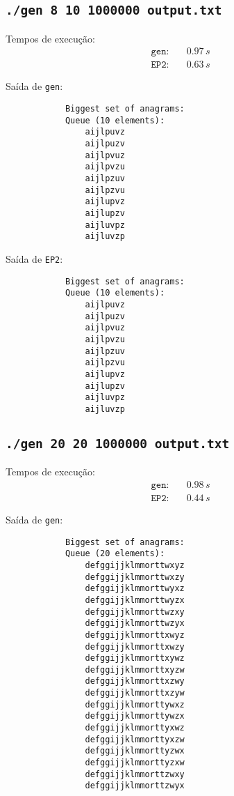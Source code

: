 \documentclass[a4paper]{article}
\newcommand{\ttt}{\texttt}
\begin{document}
    \newpage
    \subsection{\tt ./gen 8 10 1000000 output.txt}
        Tempos de execução:
        \begin{align*}
            \ttt{gen:}\quad &0.97\, s\\
            \ttt{EP2:}\quad &0.63\, s
        \end{align*}

        Saída de \ttt{gen}:
        \begin{lstlisting}
            Biggest set of anagrams:
            Queue (10 elements):
                aijlpuvz
                aijlpuzv
                aijlpvuz
                aijlpvzu
                aijlpzuv
                aijlpzvu
                aijlupvz
                aijlupzv
                aijluvpz
                aijluvzp
        \end{lstlisting}

        Saída de \ttt{EP2}:
        \begin{lstlisting}
            Biggest set of anagrams:
            Queue (10 elements):
                aijlpuvz
                aijlpuzv
                aijlpvuz
                aijlpvzu
                aijlpzuv
                aijlpzvu
                aijlupvz
                aijlupzv
                aijluvpz
                aijluvzp
        \end{lstlisting}

    \newpage
    \subsection{\tt ./gen 20 20 1000000 output.txt}
        Tempos de execução:
        \begin{align*}
            \ttt{gen:}\quad &0.98\, s\\
            \ttt{EP2:}\quad &0.44\, s
        \end{align*}

        Saída de \ttt{gen}:
        \begin{lstlisting}
            Biggest set of anagrams:
            Queue (20 elements):
                defggijjklmmorttwxyz
                defggijjklmmorttwxzy
                defggijjklmmorttwyxz
                defggijjklmmorttwyzx
                defggijjklmmorttwzxy
                defggijjklmmorttwzyx
                defggijjklmmorttxwyz
                defggijjklmmorttxwzy
                defggijjklmmorttxywz
                defggijjklmmorttxyzw
                defggijjklmmorttxzwy
                defggijjklmmorttxzyw
                defggijjklmmorttywxz
                defggijjklmmorttywzx
                defggijjklmmorttyxwz
                defggijjklmmorttyxzw
                defggijjklmmorttyzwx
                defggijjklmmorttyzxw
                defggijjklmmorttzwxy
                defggijjklmmorttzwyx

        \end{lstlisting}
\end{document}
